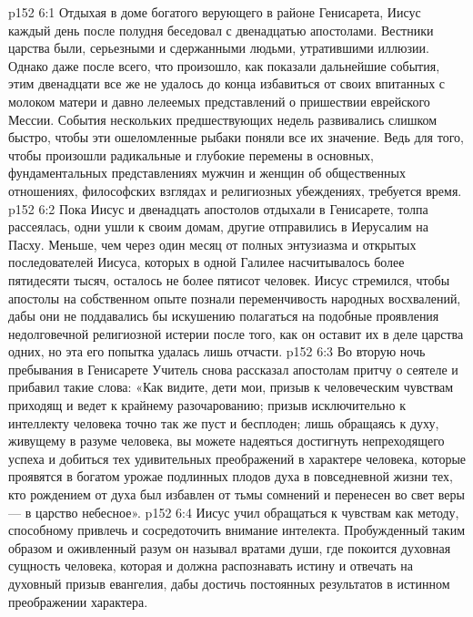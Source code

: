 \vs p152 6:1 Отдыхая в доме богатого верующего в районе Генисарета, Иисус каждый день после полудня беседовал с двенадцатью апостолами. Вестники царства были, серьезными и сдержанными людьми, утратившими иллюзии. Однако даже после всего, что произошло, как показали дальнейшие события, этим двенадцати все же не удалось до конца избавиться от своих впитанных с молоком матери и давно лелеемых представлений о пришествии еврейского Мессии. События нескольких предшествующих недель развивались слишком быстро, чтобы эти ошеломленные рыбаки поняли все их значение. Ведь для того, чтобы произошли радикальные и глубокие перемены в основных, фундаментальных представлениях мужчин и женщин об общественных отношениях, философских взглядах и религиозных убеждениях, требуется время.
\vs p152 6:2 Пока Иисус и двенадцать апостолов отдыхали в Генисарете, толпа рассеялась, одни ушли к своим домам, другие отправились в Иерусалим на Пасху. Меньше, чем через один месяц от полных энтузиазма и открытых последователей Иисуса, которых в одной Галилее насчитывалось более пятидесяти тысяч, осталось не более пятисот человек. Иисус стремился, чтобы апостолы на собственном опыте познали переменчивость народных восхвалений, дабы они не поддавались бы искушению полагаться на подобные проявления недолговечной религиозной истерии после того, как он оставит их в деле царства одних, но эта его попытка удалась лишь отчасти.
\vs p152 6:3 \pc Во вторую ночь пребывания в Генисарете Учитель снова рассказал апостолам притчу о сеятеле и прибавил такие слова: «Как видите, дети мои, призыв к человеческим чувствам приходящ и ведет к крайнему разочарованию; призыв исключительно к интеллекту человека точно так же пуст и бесплоден; лишь обращаясь к духу, живущему в разуме человека, вы можете надеяться достигнуть непреходящего успеха и добиться тех удивительных преображений в характере человека, которые проявятся в богатом урожае подлинных плодов духа в повседневной жизни тех, кто рождением от духа был избавлен от тьмы сомнений и перенесен во свет веры --- в царство небесное».
\vs p152 6:4 \pc Иисус учил обращаться к чувствам как методу, способному привлечь и сосредоточить внимание интелекта. Пробужденный таким образом и оживленный разум он называл вратами души, где покоится духовная сущность человека, которая и должна распознавать истину и отвечать на духовный призыв евангелия, дабы достичь постоянных результатов в истинном преображении характера.
